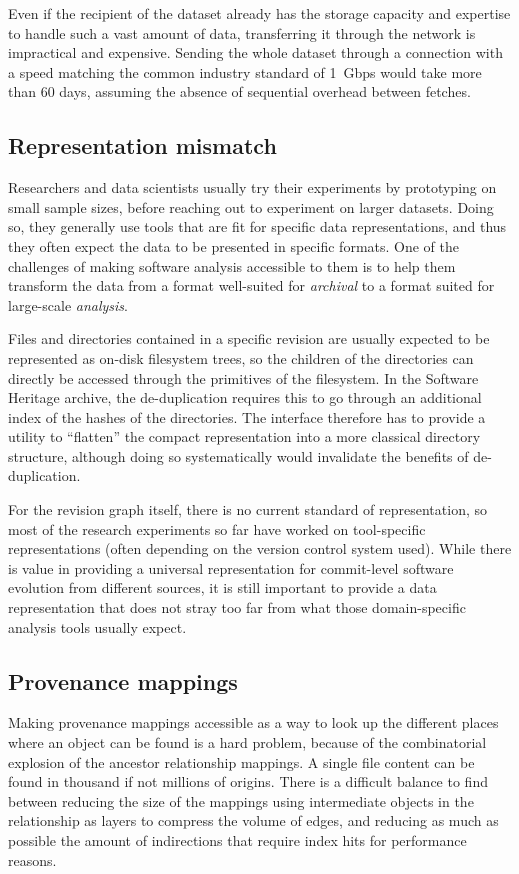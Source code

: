 Even if the recipient of the dataset already has the storage capacity and
expertise to handle such a vast amount of data, transferring it through the
network is impractical and expensive. Sending the whole dataset through a
connection with a speed matching the common industry standard of 1~Gbps would
take more than 60 days, assuming the absence of sequential overhead between
fetches.

\subsection{Representation mismatch}

Researchers and data scientists usually try their experiments by prototyping on
small sample sizes, before reaching out to experiment on larger datasets.
Doing so, they generally use tools that are fit for specific data
representations, and thus they often expect the data to be presented in
specific formats. One of the challenges of making software analysis accessible
to them is to help them transform the data from a format well-suited for
\emph{archival} to a format suited for large-scale \emph{analysis}.

Files and directories contained in a specific revision are usually expected to
be represented as on-disk filesystem trees, so the children of the
directories can directly be accessed through the primitives of the filesystem.
In the Software Heritage archive, the de-duplication requires this to go
through an additional index of the hashes of the directories. The interface
therefore has to provide a utility to ``flatten'' the compact representation
into a more classical directory structure, although doing so systematically
would invalidate the benefits of de-duplication.

For the revision graph itself, there is no current standard of representation,
so most of the research experiments so far have worked on tool-specific
representations (often depending on the version control system used). While
there is value in providing a universal representation for commit-level
software evolution from different sources, it is still important to provide a
data representation that does not stray too far from what those domain-specific
analysis tools usually expect.

\subsection{Provenance mappings}

Making provenance mappings accessible as a way to look up the different
places where an object can be found is a hard problem, because of the
combinatorial explosion of the ancestor relationship mappings.
A single file content can be found in thousand if not millions of origins.
There is a difficult balance to find between reducing the size of the
mappings using intermediate objects in the relationship as layers to compress
the volume of edges, and reducing as much as possible the amount of
indirections that require index hits for performance reasons.

